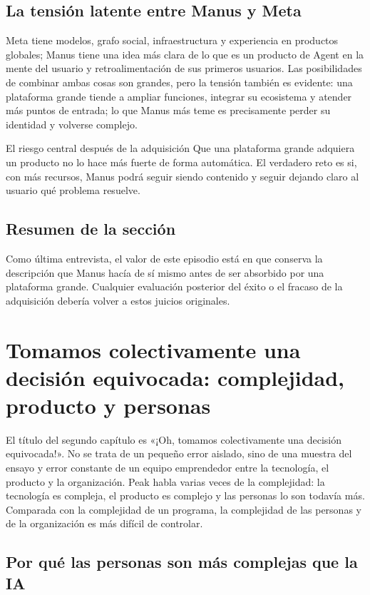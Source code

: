 \documentclass[a4paper]{article}
\begin{document}
\subsection{La tensión latente entre Manus y Meta}

Meta tiene modelos, grafo social, infraestructura y experiencia en productos globales; Manus tiene una idea más clara de lo que es un producto de Agent en la mente del usuario y retroalimentación de sus primeros usuarios. Las posibilidades de combinar ambas cosas son grandes, pero la tensión también es evidente: una plataforma grande tiende a ampliar funciones, integrar su ecosistema y atender más puntos de entrada; lo que Manus más teme es precisamente perder su identidad y volverse complejo.

\begin{warningbox}{El riesgo central después de la adquisición}
Que una plataforma grande adquiera un producto no lo hace más fuerte de forma automática. El verdadero reto es si, con más recursos, Manus podrá seguir siendo contenido y seguir dejando claro al usuario qué problema resuelve.
\end{warningbox}

\subsection{Resumen de la sección}

Como última entrevista, el valor de este episodio está en que conserva la descripción que Manus hacía de sí mismo antes de ser absorbido por una plataforma grande. Cualquier evaluación posterior del éxito o el fracaso de la adquisición debería volver a estos juicios originales.
\section{Tomamos colectivamente una decisión equivocada: complejidad, producto y personas}

El título del segundo capítulo es «¡Oh, tomamos colectivamente una decisión equivocada!». No se trata de un pequeño error aislado, sino de una muestra del ensayo y error constante de un equipo emprendedor entre la tecnología, el producto y la organización. Peak habla varias veces de la complejidad: la tecnología es compleja, el producto es complejo y las personas lo son todavía más. Comparada con la complejidad de un programa, la complejidad de las personas y de la organización es más difícil de controlar.

\subsection{Por qué las personas son más complejas que la IA}
\end{document}
